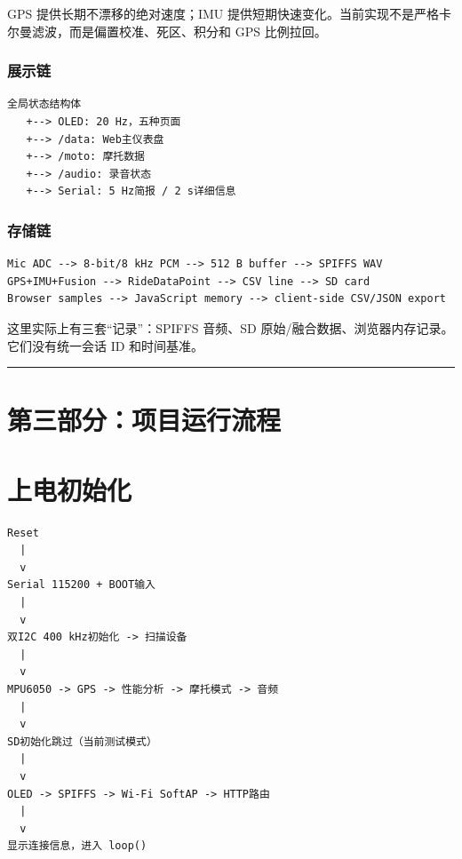 \documentclass[
  UTF8,11pt,a4paper]{ctexart}
\begin{document}
GPS 提供长期不漂移的绝对速度；IMU
提供短期快速变化。当前实现不是严格卡尔曼滤波，而是偏置校准、死区、积分和
GPS 比例拉回。

\subsubsection{展示链}\label{ux5c55ux793aux94fe}

\begin{lstlisting}
全局状态结构体
   +--> OLED: 20 Hz，五种页面
   +--> /data: Web主仪表盘
   +--> /moto: 摩托数据
   +--> /audio: 录音状态
   +--> Serial: 5 Hz简报 / 2 s详细信息
\end{lstlisting}

\subsubsection{存储链}\label{ux5b58ux50a8ux94fe}

\begin{lstlisting}
Mic ADC --> 8-bit/8 kHz PCM --> 512 B buffer --> SPIFFS WAV
GPS+IMU+Fusion --> RideDataPoint --> CSV line --> SD card
Browser samples --> JavaScript memory --> client-side CSV/JSON export
\end{lstlisting}

这里实际上有三套``记录''：SPIFFS 音频、SD
原始/融合数据、浏览器内存记录。它们没有统一会话 ID 和时间基准。

\begin{center}\rule{0.5\linewidth}{0.5pt}\end{center}

\section{第三部分：项目运行流程}\label{ux7b2cux4e09ux90e8ux5206ux9879ux76eeux8fd0ux884cux6d41ux7a0b}

\section{上电初始化}\label{ux4e0aux7535ux521dux59cbux5316}

\begin{lstlisting}
Reset
  |
  v
Serial 115200 + BOOT输入
  |
  v
双I2C 400 kHz初始化 -> 扫描设备
  |
  v
MPU6050 -> GPS -> 性能分析 -> 摩托模式 -> 音频
  |
  v
SD初始化跳过（当前测试模式）
  |
  v
OLED -> SPIFFS -> Wi-Fi SoftAP -> HTTP路由
  |
  v
显示连接信息，进入 loop()
\end{lstlisting}
\end{document}
